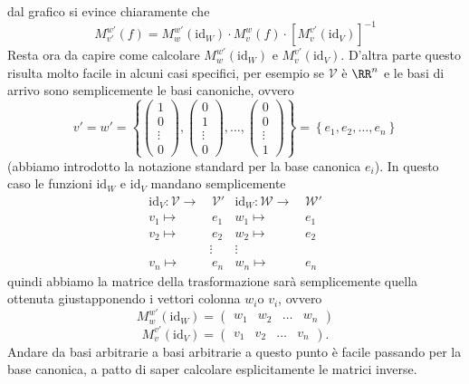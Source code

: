 \documentclass[11pt]{scrartcl}
\begin{document}
  	 dal grafico si evince chiaramente che 
  	 $$M_{v'}^{w'}(f)=M_w^{w'}(\text{id}_W) \cdot M_v^w(f) \cdot \left[M_{v}^{v'}(\text{id}_V)\right]^{-1}$$
  	 Resta ora da capire come calcolare $M_w^{w'}(\text{id}_W)$ e $M_v^{v'}(\text{id}_V)$. D'altra parte questo risulta molto facile in alcuni casi specifici, per esempio se $\mathcal{V}$ è $\RR^n$ e le basi di arrivo sono semplicemente le basi canoniche, ovvero
  	 $$v'=w'=\left\{\begin{pmatrix}
  	 	1 \\
  	 	0 \\
  	 	\vdots \\
  	 	0
  	 \end{pmatrix},\begin{pmatrix}
  	 	0 \\
  	 	1 \\
  	 	\vdots \\
  	 	0 
  	 \end{pmatrix},\dots,
  	 \begin{pmatrix}
  	 	0 \\
  	 	0 \\
  	 	\vdots \\
  	 	1
  	 \end{pmatrix}\right\}=\left\{e_1,e_2,\dots,e_n\right\}$$
  	 (abbiamo introdotto la notazione standard per la base canonica $e_i$). In questo caso le funzioni $\text{id}_W$ e $\text{id}_V$ mandano semplicemente
  	 \begin{align*}
  	 	\text{id}_V: \mathcal{V}\to &\, \mathcal{V}' & \text{id}_W:\mathcal{W}\to &\, \mathcal{W}' \\
  	 	v_1 \mapsto & \, e_1 & w_1 \mapsto & \, e_1 \\
  	 	v_2 \mapsto & \, e_2 & w_2 \mapsto & \, e_2 \\
  	 	& \!\!\!\!\vdots & \!\!\!\!\!\vdots & \\
  	 	v_n \mapsto & \, e_n & w_n \mapsto & \, e_n 
  	 \end{align*}
  	 quindi abbiamo la matrice della trasformazione sarà semplicemente quella ottenuta giustapponendo i vettori colonna $w_i$o $v_i$, ovvero
  	 $$M_w^{w'}(\text{id}_W)=
  	 \left(\begin{array}{c|c|c|c}
  	 	w_1 & w_2 & \dots & w_n
  	 \end{array}\right)
  	 $$
  	 $$M_v^{v'}(\text{id}_V)=
  	 \left(\begin{array}{c|c|c|c}
  	 	v_1 & v_2 & \dots & v_n
  	 \end{array}\right).
  	 $$
  	 Andare da basi arbitrarie a basi arbitrarie a questo punto è facile passando per la base canonica, a patto di saper calcolare esplicitamente le matrici inverse.
  	 
\end{document}
